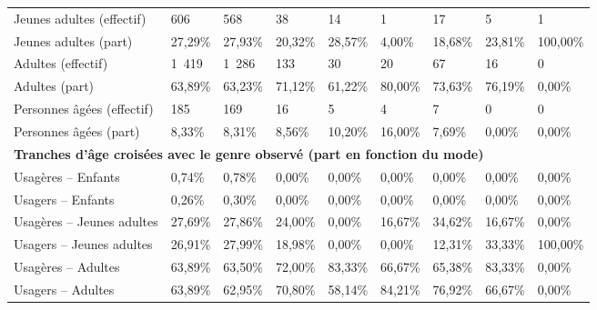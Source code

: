 \begin{longtable}{p{3.7cm}p{0.9cm}p{0.9cm}p{0.9cm}p{0.9cm}p{0.9cm}p{0.9cm}p{0.9cm}p{0.9cm}}
    \small{Jeunes adultes (effectif)} & \small{606} & \small{568} & \small{38} & \small{14} & \small{1} & \small{17} & \small{5} & \small{1}\\    
    \small{Jeunes adultes (part)} & \small{27,29\%} & \small{27,93\%} & \small{20,32\%} & \small{28,57\%} & \small{4,00\%} & \small{18,68\%} & \small{23,81\%} & \small{100,00\%}\\    
    \small{Adultes (effectif)} & \small{1~419} & \small{1~286} & \small{133} & \small{30} & \small{20} & \small{67} & \small{16} & \small{0}\\    
    \small{Adultes (part)} & \small{63,89\%} & \small{63,23\%} & \small{71,12\%} & \small{61,22\%} & \small{80,00\%} & \small{73,63\%} & \small{76,19\%} & \small{0,00\%}\\    
    \small{Personnes âgées (effectif)} & \small{185} & \small{169} & \small{16} & \small{5} & \small{4} & \small{7} & \small{0} & \small{0}\\   
    \small{Personnes âgées (part)} & \small{8,33\%} & \small{8,31\%} & \small{8,56\%} & \small{10,20\%} & \small{16,00\%} & \small{7,69\%} & \small{0,00\%} & \small{0,00\%}\\
    \hline
\multicolumn{9}{l}{\textbf{Tranches d'âge croisées avec le genre observé (part en fonction du mode)}}\\
    \small{Usagères – Enfants} & \small{0,74\%} & \small{0,78\%} & \small{0,00\%} & \small{0,00\%} & \small{0,00\%} & \small{0,00\%} & \small{0,00\%} & \small{0,00\%}\\
        \small{Usagers – Enfants} & \small{0,26\%} & \small{0,30\%} & \small{0,00\%} & \small{0,00\%} & \small{0,00\%} & \small{0,00\%} & \small{0,00\%} & \small{0,00\%}\\    
    \small{Usagères – Jeunes adultes} & \small{27,69\%} & \small{27,86\%} & \small{24,00\%} & \small{0,00\%} & \small{16,67\%} & \small{34,62\%} & \small{16,67\%} & \small{0,00\%}\\   
    \small{Usagers – Jeunes adultes} & \small{26,91\%} & \small{27,99\%} & \small{18,98\%} & \small{0,00\%} & \small{0,00\%} & \small{12,31\%} & \small{33,33\%} & \small{100,00\%}\\    
    \small{Usagères – Adultes} & \small{63,89\%} & \small{63,50\%} & \small{72,00\%} & \small{83,33\%} & \small{66,67\%} & \small{65,38\%} & \small{83,33\%} & \small{0,00\%}\\    
    \small{Usagers – Adultes} & \small{63,89\%} & \small{62,95\%} & \small{70,80\%} & \small{58,14\%} & \small{84,21\%} & \small{76,92\%} & \small{66,67\%} & \small{0,00\%}\\    

\end{longtable}
